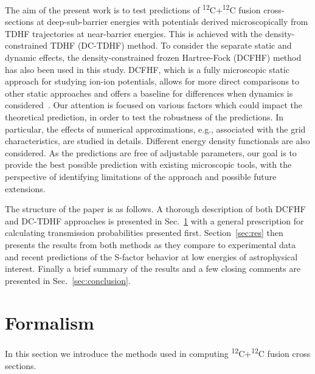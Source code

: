 
The aim of the present work is to test predictions of  \textsuperscript{12}C+\textsuperscript{12}C fusion cross-sections 
at deep-sub-barrier energies with potentials derived microscopically from TDHF trajectories at near-barrier energies.
This is achieved with the density-constrained TDHF (DC-TDHF) method. 
To consider the separate static and dynamic effects, the density-constrained frozen Hartree-Fock (DCFHF) method has also been used in this study.
DCFHF, which is a fully microscopic static approach for studying ion-ion potentials, 
allows for more direct comparisons to other static approaches and offers a baseline for differences when dynamics is considered~\protect\citep{simenel2017}. 
Our attention is focused on various factors which could impact the theoretical prediction, in order to test the robustness of the predictions. 
In particular, the effects of numerical approximations, e.g., associated with the grid characteristics, are studied in details. 
Different energy density functionals are also considered.
As the predictions are free of adjustable parameters, our goal is to provide the best possible prediction with existing microscopic tools, 
with the perspective of identifying limitations of the approach and possible future extensions.

The structure of the paper is as follows. A thorough description of both DCFHF and DC-TDHF approaches is presented in Sec.~\ref{sec:form} 
with a general prescription for calculating transmission probabilities presented first. 
Section~\ref{sec:res} then presents the results from both methods as they compare to experimental data 
and recent predictions of the S-factor behavior at low energies of astrophysical interest. 
Finally a brief summary of the results and a few closing comments are presented in Sec.~\ref{sec:conclusion}.

\section{Formalism}
\label{sec:form}
In this section we introduce the methods used in computing \textsuperscript{12}C+\textsuperscript{12}C fusion cross sections.
